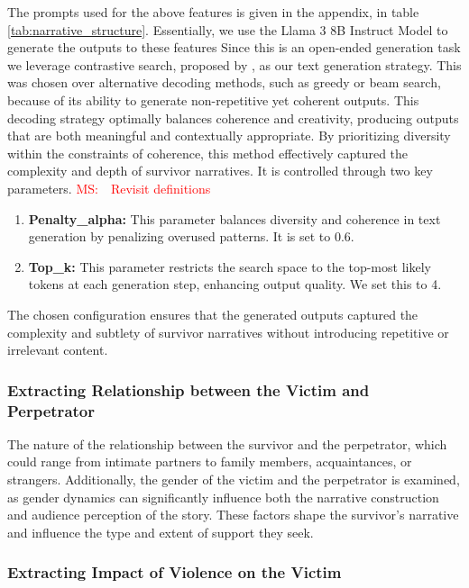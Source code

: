 \documentclass[11pt]{article}
\newcommand{\ms}[1]{\textcolor{red}{{MS:~~#1}}}
\begin{document}
The prompts used for the above features is given in the appendix, in table \ref{tab:narrative_structure}.
Essentially, we use the Llama 3 8B Instruct Model to generate the outputs to these features
Since this is an open-ended generation task we leverage contrastive search, proposed by \citep{su2022contrastive}, as our text generation strategy. This was chosen over alternative decoding methods, such as greedy or beam search, because of its ability to generate non-repetitive yet coherent outputs. 
This decoding strategy optimally balances coherence and creativity, producing outputs that are both meaningful and contextually appropriate. 
By prioritizing diversity within the constraints of coherence, this method effectively captured the complexity and depth of survivor narratives.
It is controlled through two key parameters. \ms{Revisit definitions}

\begin{enumerate}
    \item \textbf{Penalty\_alpha:} This parameter balances diversity and coherence in text generation by penalizing overused patterns. It is set to 0.6.
    \item \textbf{Top\_k:} This parameter restricts the search space to the top-most likely tokens at each generation step, enhancing output quality. We set this to 4. 
\end{enumerate}

The chosen configuration ensures that the generated outputs captured the complexity and subtlety of survivor narratives without introducing repetitive or irrelevant content.


\subsubsection{Extracting Relationship between the Victim and Perpetrator}

The nature of the relationship between the survivor and the perpetrator, which could range from intimate partners to family members, acquaintances, or strangers. 
Additionally, the gender of the victim and the perpetrator is examined, as gender dynamics can significantly influence both the narrative construction and audience perception of the story. 
These factors shape the survivor's narrative and influence the type and extent of support they seek.

\subsubsection{Extracting Impact of Violence on the Victim}
\end{document}
